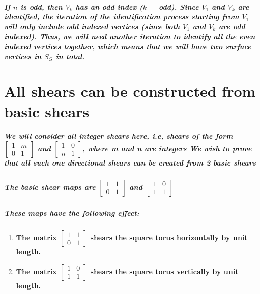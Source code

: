 \documentclass{report}
\begin{document}
\paragraph{If $n$ is odd, then $V_k$ has an odd index ($k$ = odd). Since $V_1$ and $V_k$ are identified, the iteration of the identification process starting from $V_1$ will only include odd indexed vertices (since both $V_1$ and $V_k$ are odd indexed). Thus, we will need another iteration to identify all the even indexed vertices together, which means that we will have two surface vertices in $S_G$ in total.}



\chapter{All shears can be constructed from basic shears}

\paragraph{We will consider all integer shears here, i.e, shears of the form 
$\begin{bmatrix}
1&m\\0&1
\end{bmatrix}$
and
$\begin{bmatrix}
1&0\\n&1
\end{bmatrix}$,
where m and n are integers
We wish to prove that all such one directional shears can be created from 2 basic shears}


\paragraph{The basic shear maps are 
$\begin{bmatrix}
1&1\\0&1
\end{bmatrix}$
and
$\begin{bmatrix}
1&0\\1&1
\end{bmatrix}$
}

\paragraph{These maps have the following effect:}

\begin{enumerate}
\item \textbf{The matrix
$\begin{bmatrix}
1&1\\0&1
\end{bmatrix}$
shears the square torus 
horizontally by unit length.
}

\item \textbf{The matrix
$\begin{bmatrix}
1&0\\1&1
\end{bmatrix}$
shears the square torus vertically 
by unit length.
}
\end{enumerate}
\end{document}
